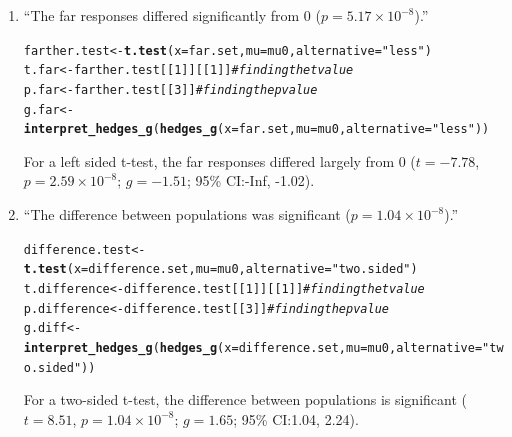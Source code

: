 \documentclass{article}\usepackage[]{graphicx}\usepackage[]{xcolor}
\makeatletter
\newcommand{\hlnum}[1]{\textcolor[rgb]{0.686,0.059,0.569}{#1}}%
\newcommand{\hlsng}[1]{\textcolor[rgb]{0.192,0.494,0.8}{#1}}%
\newcommand{\hlcom}[1]{\textcolor[rgb]{0.678,0.584,0.686}{\textit{#1}}}%
\newcommand{\hldef}[1]{\textcolor[rgb]{0.345,0.345,0.345}{#1}}%
\newcommand{\hlkwb}[1]{\textcolor[rgb]{0.69,0.353,0.396}{#1}}%
\newcommand{\hlkwc}[1]{\textcolor[rgb]{0.333,0.667,0.333}{#1}}%
\newcommand{\hlkwd}[1]{\textcolor[rgb]{0.737,0.353,0.396}{\textbf{#1}}}%
\newenvironment{kframe}{%
 \def\at@end@of@kframe{}%
 \ifinner\ifhmode%
  \def\at@end@of@kframe{\end{minipage}}%
  \begin{minipage}{\columnwidth}%
 \fi\fi%
 \def\FrameCommand##1{\hskip\@totalleftmargin \hskip-\fboxsep
 \colorbox{shadecolor}{##1}\hskip-\fboxsep
     \hskip-\linewidth \hskip-\@totalleftmargin \hskip\columnwidth}%
 \MakeFramed {\advance\hsize-\width
   \@totalleftmargin\z@ \linewidth\hsize
   \@setminipage}}%
 {\par\unskip\endMakeFramed%
 \at@end@of@kframe}
\newenvironment{knitrout}{}{} %
\makeatother
\begin{document}
\begin{enumerate}
\begin{enumerate}
  \item ``The far responses differed significantly from 0 ($p=5.17 \times 10^{-8}$).''
\begin{knitrout}\scriptsize
{}\color{fgcolor}\begin{kframe}
\begin{alltt}
\hldef{farther.test} \hlkwb{<-} \hlkwd{t.test}\hldef{(}\hlkwc{x}\hldef{=far.set,} \hlkwc{mu} \hldef{= mu0,} \hlkwc{alternative} \hldef{=} \hlsng{"less"}\hldef{)}
\hldef{t.far} \hlkwb{<-} \hldef{farther.test[[}\hlnum{1}\hldef{]][[}\hlnum{1}\hldef{]]} \hlcom{#finding the t value }
\hldef{p.far} \hlkwb{<-} \hldef{farther.test[[}\hlnum{3}\hldef{]]} \hlcom{#finding the p value}
\hldef{g.far} \hlkwb{<-} \hlkwd{interpret_hedges_g}\hldef{(}\hlkwd{hedges_g}\hldef{(}\hlkwc{x} \hldef{= far.set,} \hlkwc{mu} \hldef{= mu0,} \hlkwc{alternative} \hldef{=} \hlsng{"less"}\hldef{))}
\end{alltt}
\end{kframe}
\end{knitrout}
For a left sided t-test, the far responses differed largely from 0 ($t= -7.78$, $p=2.59 \times 10^{-8}$; $g= -1.51$; 95\% CI:-Inf, -1.02). 

  \item ``The difference between populations was significant ($p=1.04 \times10^{-8}$).''
\begin{knitrout}\scriptsize
{}\color{fgcolor}\begin{kframe}
\begin{alltt}
\hldef{difference.test} \hlkwb{<-} \hlkwd{t.test}\hldef{(}\hlkwc{x}\hldef{=difference.set,} \hlkwc{mu} \hldef{= mu0,} \hlkwc{alternative} \hldef{=} \hlsng{"two.sided"}\hldef{)}
\hldef{t.difference} \hlkwb{<-} \hldef{difference.test[[}\hlnum{1}\hldef{]][[}\hlnum{1}\hldef{]]} \hlcom{#finding the t value }
\hldef{p.difference} \hlkwb{<-} \hldef{difference.test[[}\hlnum{3}\hldef{]]} \hlcom{#finding the p value}
\hldef{g.diff} \hlkwb{<-} \hlkwd{interpret_hedges_g}\hldef{(}\hlkwd{hedges_g}\hldef{(}\hlkwc{x} \hldef{= difference.set,} \hlkwc{mu} \hldef{= mu0,} \hlkwc{alternative} \hldef{=} \hlsng{"two.sided"}\hldef{))}
\end{alltt}
\end{kframe}
\end{knitrout}
For a two-sided t-test, the difference between populations is significant ($t= 8.51$, $p=1.04 \times 10^{-8}$; $g= 1.65$; 95\% CI:1.04, 2.24). 


\end{enumerate}
\end{enumerate}
\end{document}
